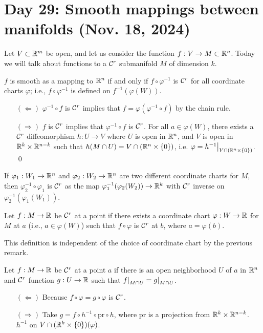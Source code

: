 \section{Day 29: Smooth mappings between manifolds (Nov. 18, 2024)}
Let $V \subset \mathbb R^m$ be open, and let us consider the function $f : V \to M \subset \mathbb R^n$. Today we will talk about functions to a $\mathcal C^r$ submanifold $M$ of dimension $k$.
\begin{simpleclaim}
    $f$ is smooth as a mapping to $\mathbb R^n$ if and only if $f \circ \varphi^{-1}$ is $\mathcal C^r$ for all coordinate charts $\varphi$; i.e., $f \circ \varphi^{-1}$ is defined on $f^{-1}(\varphi(W))$.
\end{simpleclaim}
\begin{itemize}
    \item[$(\Leftarrow)$] $\varphi^{-1} \circ f$ is $\mathcal C^r$ implies that $f = \varphi (\varphi^{-1} \circ f)$ by the chain rule.
    \item[$(\Rightarrow)$] $f$ is $\mathcal C^r$ implies that $\varphi^{-1} \circ f$ is $\mathcal C^r$. For all $a \in \varphi(W)$, there exists a $\mathcal C^r$ diffeomorphism $h : U \to V$ where $U$ is open in $\mathbb R^n$, and $V$ is open in $\mathbb R^k \times \mathbb R^{n-k}$ such that $h(M \cap U) = V \cap (\mathbb R^n \times \{0\})$, i.e. $\varphi = \restr{h^{-1}}{V \cap (\RR^n \times \{0\})}$. \qed
\end{itemize}
If $\varphi_1 : W_1 \to \mathbb R^n$ and $\varphi_2 : W_2 \to \mathbb R^n$ are two different coordinate charts for $M$, then $\varphi_2^{-1} \circ \varphi_1$ is $\mathcal C^r$ as the map $\varphi_1^{-1} (\varphi_2 (W_2)) \to \mathbb R^k$ with $\mathcal C^r$ inverse on $\varphi_2^{-1} (\varphi_1 (W_1))$.
\begin{definition}
    Let $f : M \to \mathbb R$ be $\mathcal C^r$ at a point if there exists a coordinate chart $\varphi : W \to \mathbb R$ for $M$ at $a$ (i.e., $a \in \varphi(W)$) such that $f \circ \varphi$ is $\mathcal C^r$ at $b$, where $a = \varphi(b)$.
\end{definition}
\noindent This definition is independent of the choice of coordinate chart by the previous remark.
\begin{simplelemma}
    Let $f : M \to \mathbb R$ be $\mathcal C^r$ at a point $a$ if there is an open neighborhood $U$ of $a$ in $\mathbb R^n$ and $\mathcal C^r$ function $g : U \to \mathbb R$ such that $\restr{f}{M \cap U} = \restr{g}{M \cap U}$.
\end{simplelemma}
\begin{itemize}
    \item[$(\Leftarrow)$] Because $f \circ \varphi = g \circ \varphi$ is $\mathcal C^r$.
    \item[$(\Rightarrow)$] Take $g = f \circ h^{-1} \circ \mathrm{pr} \circ h$, where $\mathrm{pr}$ is a projection from $\mathbb R^k \times \mathbb R^{n-k}$. $h^{-1}$ on $V \cap (\mathbb R^k \times \{0\}) (\varphi)$.
\end{itemize}
